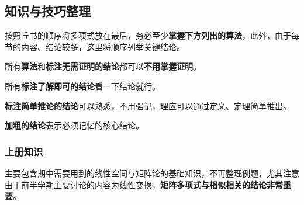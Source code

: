 \documentclass[a4paper,UTF8,fontset=windows,AutoFakeBold]{ctexart}
\newcommand*{\note}{\noindent *}
\begin{document}
\subsection{知识与技巧整理}
\note 按照丘书的顺序将多项式放在最后，务必至少\textbf{掌握下方列出的算法}，此外，由于每节的内容、结论较多，这里将顺序列举关键结论。

\note 所有\textbf{算法}和\textbf{标注无需证明的结论}都可以\textbf{不用掌握证明}。

\note 所有\textbf{标注了解即可的结论}看一下结论就行。

\note \textbf{标注简单推论的结论}可以熟悉，不用强记，理应可以通过定义、定理简单推出。

\note \textbf{加粗的结论}表示必须记忆的核心结论。

\subsubsection{上册知识}
主要包含期中需要用到的线性空间与矩阵论的基础知识，不再整理例题，尤其注意由于前半学期主要讨论的内容为线性变换，\textbf{矩阵多项式与相似相关的结论非常重要}。
\end{document}

